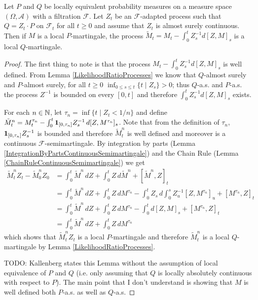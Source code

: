 \begin{thm}\label{AbstractTransformationOfDriftContinuousLocalMartingale}Let $P$ and $Q$ be locally equivalent probability measures on a measure space $(\Omega, \mathcal{A})$ with a filtration $\mathcal{F}$.   Let $Z_t$ be an $\mathcal{F}$-adapted process such that $Q = Z_t \cdot P$ on $\mathcal{F}_t$ for all $t \geq 0$ and assume that $Z_t$ is almost surely continuous.  Then if $M$ is a local $P$-martingale, the process $\tilde{M}_t = M_t - \int_0^t Z^{-1}_s d[Z,M]_s$ is a local $Q$-martingale.
\end{thm}
\begin{proof}
The first thing to note is that the process $M_t - \int_0^t Z^{-1}_s d[Z,M]_s$ is well defined.  From Lemma \ref{LikelihoodRatioProcesses} we know that  $Q$-almost surely and $P$-almost surely, for all $t \geq 0$ $\inf_{0 \leq s \leq t} \lbrace t \mid Z_s \rbrace > 0$; thus $Q$-a.s. and $P$-a.s. the process $Z^{-1}$ is bounded on every $[0,t]$ and therefore $\int_0^t Z^{-1}_s d[Z,M]_s$ exists.


For each $n \in \mathbb{N}$, let $\tau_n = \inf \lbrace t \mid Z_t < 1/n \rbrace$ and define $\tilde{M}^n_t = M_t^{\tau_n} - \int_0^t \textbf{1}_{[0,\tau_n]} Z_s^{-1} \, d[Z, M^{\tau_n}]_s$.  Note that from the definition of $\tau_n$, $\textbf{1}_{[0,\tau_n]} Z_s^{-1}$ is bounded and therefore $\tilde{M}^n_t$ is well defined and moreover is a continuous $\mathcal{F}$-semimartingale.  By  integration by parts (Lemma \ref{IntegrationByPartsContinuousSemimartingale}) and the Chain Rule (Lemma \ref{ChainRuleContinuousSemimartingale})  we get
\begin{align*}
\tilde{M}^n_t Z_t - \tilde{M}^n_0 Z_0 &= \int_0^t \tilde{M}^n \, dZ + \int_0^t Z \, d\tilde{M}^n + [\tilde{M}^n, Z]_t \\
&= \int_0^t \tilde{M}^n \, dZ + \int_0^t Z \, d M^{\tau_n} -  \int_0^t Z_s \, d \int_0^s Z^{-1}_u [Z, M^{\tau_n}]_u + [M^{\tau_n}, Z]_t \\
&= \int_0^t \tilde{M}^n \, dZ + \int_0^t Z \, d M^{\tau_n} -  \int_0^t d[Z, M]_s + [M^{\tau_n}, Z]_t \\
&= \int_0^t \tilde{M}^n \, dZ + \int_0^t Z \, d M^{\tau_n}
\end{align*}
which shows that $\tilde{M}^n_t Z_t$ is a local $P$-martingale and therefore $\tilde{M}^n_t$ is a local $Q$-martingale by Lemma \ref{LikelihoodRatioProcesses}.

TODO: Kallenberg states this Lemma without the assumption of local equivalence of $P$ and $Q$ (i.e. only assuming that $Q$ is locally absolutely continuous with respect to $P$).  The main point that I don't understand is showing that $M$ is well defined both $P$-a.s. as well as $Q$-a.s.


\end{proof}
